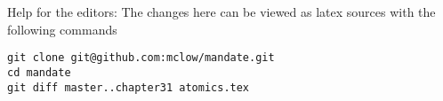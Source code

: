 
\vfill
Help for the editors: The changes here can be viewed as latex sources with the following commands
\begin{verbatim}
git clone git@github.com:mclow/mandate.git
cd mandate
git diff master..chapter31 atomics.tex
\end{verbatim}
